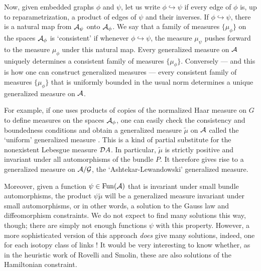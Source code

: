Now, given embedded graphs $\phi$ and $\psi$, let us write $\phi
\hookrightarrow \psi$ if every edge of $\phi$ is, up to
reparametrization, a product of edges of $\psi$ and their inverses.  If
$\phi \hookrightarrow \psi$, there is a natural map from ${\cal A}_\psi$ onto
${\cal A}_\phi$.  We say that a family of measures $\{\mu_\phi\}$ on the
spaces ${\cal A}_\phi$ is `consistent' if whenever $\phi \hookrightarrow
\psi$, the measure $\mu_\psi$ pushes forward to the measure $\mu_\phi$
under this natural map.  Every generalized measure on ${\cal A}$ uniquely
determines a consistent family of measures $\{\mu_\phi\}$.  Conversely
--- and this is how one can construct generalized measures --- every
consistent family of measures $\{\mu_\phi\}$ that is uniformly bounded
in the usual norm determines a unique generalized measure
on ${\cal A}$.

For example, if one uses products of copies of the normalized Haar
measure on $G$ to define measures on the spaces ${\cal A}_\phi$, one can
easily check the consistency and boundedness conditions and obtain a
generalized measure $\tilde\mu$ on ${\cal A}$ called the `uniform' generalized
measure \cite{AL,Baez3}.  This is a kind of partial substitute for the
nonexistent Lebesgue measure ${\cal D}A$.  In particular, $\tilde \mu$
is strictly positive and invariant under all automorphisms of the bundle
$P$.  It therefore gives rise to a generalized measure on ${\cal A}/{\cal G}$,
the `Ashtekar-Lewandowski' generalized measure.


Moreover, given a function $\psi \in {\rm Fun}({\cal A})$ that is invariant
under small bundle automorphisms, the product $\psi \tilde \mu$ will be
a generalized measure invariant under small automorphisms, or in other
words, a solution to the Gauss law and diffeomorphism constraints.  We
do not expect to find many solutions this way, though; there are simply
not enough functions $\psi$ with this property.  However, a more
sophisticated version of this approach {\it does} give many solutions,
indeed, one for each isotopy class of links \cite{Ashtekar2.5}!  It
would be very interesting to know whether, as in the heuristic work of
Rovelli and Smolin, these are also solutions of the Hamiltonian
constraint.

